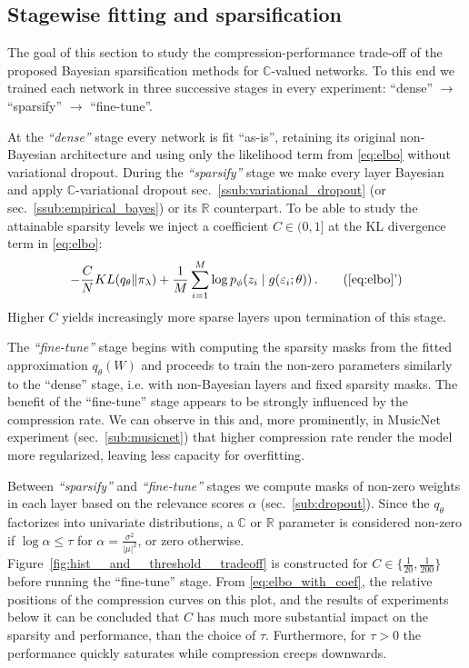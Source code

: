 \documentclass[a4paper,10pt]{article}
\newcommand{\real}{\mathbb{R}}
\newcommand{\cplx}{\mathbb{C}}
\begin{document}
\subsection{Stagewise fitting and sparsification} %
\label{sub:fitting_and_sparsification}

The goal of this section to study the compression-performance trade-off of the proposed Bayesian
sparsification methods for $\cplx$-valued networks. To this end we trained each network in
three successive stages in every experiment: ``dense'' $\to$ ``sparsify'' $\to$ ``fine-tune''.

At the \textit{``dense''} stage every network is fit ``as-is'', retaining its original
non-Bayesian architecture and using only the likelihood term from \eqref{eq:elbo} without
variational dropout.
%
During the \textit{``sparsify''} stage we make every layer Bayesian and apply $\cplx$-variational
dropout sec.~\ref{ssub:variational_dropout} (or sec.~\ref{ssub:empirical_bayes}) or its $\real$
counterpart. To be able to study the attainable sparsity levels we inject a coefficient $
  C \in (0, 1]
$ at the KL divergence term in \eqref{eq:elbo}:
\begin{equation}  \label{eq:elbo_with_coef}
    - \frac{C}N KL(q_{\theta} \| \pi_{\lambda})
    + \frac1{M} \sum_{i=1}^M
        \log p_{\phi}(z_i \mid g(\varepsilon_i; \theta))
    \,. \tag{\ref{eq:elbo}'}
\end{equation}
Higher $C$ yields increasingly more sparse layers upon termination of this stage.

The \textit{``fine-tune''} stage begins with computing the sparsity masks from the fitted
approximation $q_\theta(W)$ and proceeds to train the non-zero parameters similarly to
the ``dense'' stage, i.e. with non-Bayesian layers and fixed sparsity masks. 
%
The benefit of the ``fine-tune'' stage appears to be strongly influenced by the compression
rate. We can observe in this and, more prominently, in MusicNet experiment (sec.~\ref{sub:musicnet})
that higher compression rate render the model more regularized, leaving less capacity for
overfitting.

Between \textit{``sparsify''} and \textit{``fine-tune''} stages we compute masks of non-zero
weights in each layer based on the relevance scores $\alpha$ (sec.~\ref{sub:dropout}). Since
the $q_\theta$ factorizes into univariate distributions, a $\cplx$ or $\real$ parameter is
considered non-zero if $\log \alpha \leq \tau$ for $
  \alpha = \tfrac{\sigma^2}{\lvert\mu\rvert^2}
$, or zero otherwise. Figure~\ref{fig:hist__and__threshold__tradeoff} is constructed
for $C \in \{\tfrac1{20}, \frac1{200}\}$ before running the ``fine-tune'' stage. From
\eqref{eq:elbo_with_coef}, the relative positions of the compression curves on this
plot, and the results of experiments below it can be concluded that $C$ has much more
substantial impact on the sparsity and performance, than the choice of $\tau$. Furthermore,
for $\tau > 0$ the performance quickly saturates while compression creeps downwards.
\end{document}
